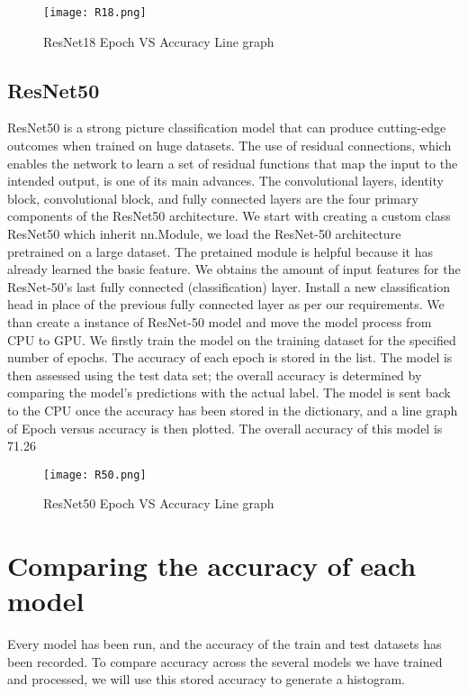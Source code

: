 \documentclass[10pt,twocolumn,letterpaper]{article}
\begin{document}
\begin{figure}[h]
    \centering
    \texttt{[image: R18.png]}
    \caption{ResNet18 Epoch VS Accuracy Line graph}
    \label{fig:example_image}
\end{figure}
\text{}

\subsection{ResNet50}
ResNet50 is a strong picture classification model that can produce cutting-edge outcomes when trained on huge datasets. The use of residual connections, which enables the network to learn a set of residual functions that map the input to the intended output, is one of its main advances. The convolutional layers, identity block, convolutional block, and fully connected layers are the four primary components of the ResNet50 architecture. We start with creating a custom class ResNet50 which inherit nn.Module,  we load the ResNet-50 architecture pretrained on a large dataset. The pretained module is helpful because it has already learned the basic feature. We obtains the amount of input features for the ResNet-50's last fully connected (classification) layer. Install a new classification head in place of the previous fully connected layer as per our requirements. We than create a instance of ResNet-50 model and move the model process from CPU to GPU. We firstly train the model on the training dataset for the specified number of epochs. The accuracy of each epoch is stored in the list. The model is then assessed using the test data set; the overall accuracy is determined by comparing the model's predictions with the actual label. The model is sent back to the CPU once the accuracy has been stored in the dictionary, and a line graph of Epoch versus accuracy is then plotted.  The overall accuracy of this model is 71.26%

\begin{figure}[h]
    \centering
    \texttt{[image: R50.png]}
    \caption{ResNet50 Epoch VS Accuracy Line graph}
    \label{fig:example_image}
\end{figure}
\text{}

\section{Comparing the accuracy of each model}
Every model has been run, and the accuracy of the train and test datasets has been recorded. To compare accuracy across the several models we have trained and processed, we will use this stored accuracy to generate a histogram. 
\end{document}
